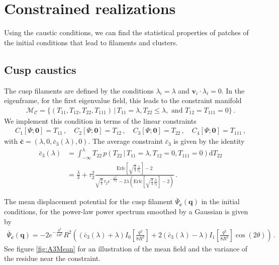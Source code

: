 \documentclass[a4paper, 11pt]{article}
\begin{document}
\section{Constrained realizations}\label{sec:simulation}
Using the caustic conditions, we can find the statistical properties of patches of the initial conditions that lead to filaments and clusters.

\subsection{Cusp caustics}
The cusp filaments are defined by the conditions $\lambda_i=\lambda$ and $\bm{v}_i \cdot \lambda_i = 0$. In the eigenframe, for the first eigenvalue field, this leads to the constraint manifold
\begin{align}
\mathcal{M}_{\mathcal{C}} = \{(T_{11},T_{12},T_{22}, T_{111})\,|\,   T_{11} = \lambda,T_{22}\leq \lambda,\text{ and }T_{12}=T_{111}=0\}\,.
\end{align}
We implement this condition in terms of the linear constraints
\begin{align}
C_1[\Psi;\bm{0}]=T_{11}\,,\quad
C_2[\Psi;\bm{0}]=T_{12}\,,\quad
C_3[\Psi;\bm{0}]=T_{22}\,,\quad
C_4[\Psi;\bm{0}]=T_{111}\,,
\end{align}
with $\bar{\bm{c}}=(\lambda,0,\bar{c}_3(\lambda),0)$. The average constraint $\bar{c}_3$ is given by the identity
\begin{align}
\bar{c}_3(\lambda) &= \int_{-\infty}^\lambda T_{22}\, p(T_{22}\,|\, T_{11}=\lambda, T_{12}=0,T_{111}=0)\mathrm{d}T_{22} \nonumber \\
&= \frac{\lambda}{3} + \tau_2^2 \frac{
 \text{Erfc}\left[\sqrt{\frac{2}{3}}\frac{\lambda}{\tau_2}\right]-2
 }{ \sqrt{\frac{6}{\pi}} \tau_2 e^{-\frac{2 \lambda^2}{3\tau_2^2}} -2 \lambda \left( \text{Erfc}\left[\sqrt{\frac{2}{3}}\frac{\lambda}{\tau_2}\right]-2 \right)}\,.
\end{align}
%


The mean displacement potential for the cusp filament  $\bar{\Psi}_{\bar{\bm{c}}}(\bm{q})$ in the initial conditions, for the power-law power spectrum smoothed by a Gaussian is given by
\begin{align}
\bar{\Psi}_{\bar{\bm{c}}}(\bm{q}) = 
-2 e^{-\frac{q^2}{8R^2}} R^2\left((\bar{c}_3(\lambda) + \lambda) I_{0}\left[\frac{q^2}{8R^2}\right]
+2 (\bar{c}_3(\lambda) - \lambda) I_{1}\left[\frac{q^2}{8R^2}\right] \cos (2\theta)\right)\,.
\end{align}
See figure \ref{fig:A3Mean} for an illustration of the mean field and the variance of the residue near the constraint.
\end{document}
